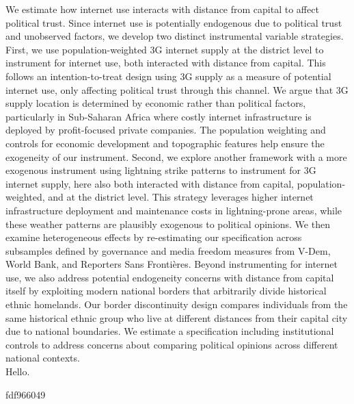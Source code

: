 \documentclass[11pt]{article}
\begin{document}
We estimate how internet use interacts with distance from capital to affect political trust.
Since internet use is potentially endogenous due to political trust and unobserved factors, we develop two distinct instrumental variable strategies.
First, we use population-weighted 3G internet supply at the district level to instrument for internet use, both interacted with distance from capital.
This follows an intention-to-treat design using 3G supply as a measure of potential internet use, only affecting political trust through this channel.
We argue that 3G supply location is determined by economic rather than political factors, particularly in Sub-Saharan Africa where costly internet infrastructure is deployed by profit-focused private companies.
The population weighting and controls for economic development and topographic features help ensure the exogeneity of our instrument.
Second, we explore another framework with a more exogenous instrument using lightning strike patterns to instrument for 3G internet supply, here also both interacted with distance from capital, population-weighted, and at the district level.
This strategy leverages higher internet infrastructure deployment and maintenance costs in lightning-prone areas, while these weather patterns are plausibly exogenous to political opinions.
We then examine heterogeneous effects by re-estimating our specification across subsamples defined by governance and media freedom measures from V-Dem, World Bank, and Reporters Sans Frontières.
Beyond instrumenting for internet use, we also address potential endogeneity concerns with distance from capital itself by exploiting modern national borders that arbitrarily divide historical ethnic homelands.
Our border discontinuity design compares individuals from the same historical ethnic group who live at different distances from their capital city due to national boundaries.
We estimate a specification including institutional controls to address concerns about comparing political opinions across different national contexts.\\

Hello.


fdf966049
\end{document}
